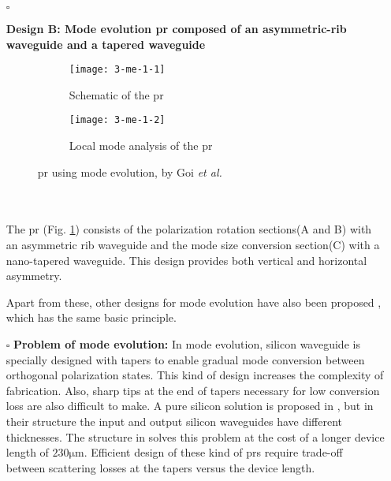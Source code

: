 \documentclass[../report.tex]{subfiles}
\begin{document}
\begin{itemize}[leftmargin=*]
	\item[$\square$] \begin{minipage}[t]{\textwidth}\textbf{Design B: Mode evolution \gls{pr} composed of an asymmetric-rib waveguide and a tapered waveguide}
	\begin{figure}[H] %
		\begin{subfigure}[t]{0.45\textwidth}
			\texttt{[image: 3-me-1-1]}
			\caption{Schematic of the \gls{pr}}
			\label{fig:3_me_1_1}
		\end{subfigure}
		\hfill
		\begin{subfigure}[t]{0.45\textwidth}
			\texttt{[image: 3-me-1-2]}
			\caption{Local mode analysis of the \gls{pr}}
			\label{fig:3_me_1_2}
		\end{subfigure}
		\caption{\gls{pr} using mode evolution, by Goi \textit{et al.} \cite{kazuhiro_integrated_2015}}
	\end{figure}
	\end{minipage}\\\\
	\noindent The \gls{pr} (Fig. \ref{fig:3_me_1_1}) consists of the polarization rotation sections(A and B) with an asymmetric rib waveguide and the mode size conversion section(C) with a nano-tapered waveguide. This design provides both vertical and horizontal asymmetry. \par
	 
	Apart from these, other designs for mode evolution have also been proposed \cite{chen_compact_2011,zhang_efficient_2012,justin_conference_2012}, which has the same basic principle.
	
	\item[$\square$] \textbf{Problem of mode evolution:} In mode evolution, silicon waveguide is specially designed with tapers to enable gradual mode conversion between orthogonal polarization states. This kind of design increases the complexity of fabrication. Also, sharp tips at the end of tapers necessary for low conversion loss are also difficult to make. A pure silicon solution is proposed in \cite{zhang_selected_2010}, but in their structure the input and output silicon waveguides have different thicknesses. The structure in \cite{kazuhiro_integrated_2015} solves this problem at the cost of a longer device length of $230 \si{\micro\meter}$. Efficient design of these kind of \gls{pr}s require trade-off between scattering losses at the tapers versus the device length.
\end{itemize}
\end{document}
